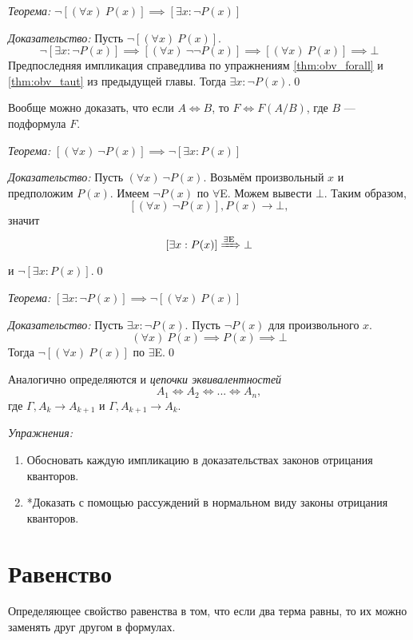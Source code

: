 \vspace{1em}
{\it Теорема:} $\lnot[(\forall x)~P(x)]\implies [\exists x:\lnot P(x)]$

{\it Доказательство:}
Пусть $\lnot[(\forall x)~P(x)]$.
\[
  \lnot[\exists x:\lnot P(x)]\implies [(\forall x)~\lnot\lnot P(x)]
  \implies [(\forall x)~P(x)]\implies\bot
\]
Предпоследняя импликация справедлива по упражнениям
\ref{thm:obv_forall} и \ref{thm:obv_taut} из предыдущей главы.
Тогда $\exists x:\lnot P(x)$.\qed

Вообще можно доказать, что если ${A\iff B}$, то ${F\iff F(A/B)}$,
где $B$ --- подформула $F$.

\vspace{1em}
{\it Теорема:} $[(\forall x)~\lnot P(x)]\implies \lnot[\exists x:P(x)]$

{\it Доказательство:}
Пусть $(\forall x)~\lnot P(x)$. Возьмём произвольный $x$
и предположим $P(x)$.
Имеем $\lnot P(x)$ по $\forall$E. Можем вывести $\bot$.
Таким образом,
\[
  [(\forall x)~\lnot P(x)],P(x)\to \bot,
\]
значит
\[
  [\exists x:P(x)]\xRightarrow{\exists\text{E}}\bot
\]
и $\lnot[\exists x:P(x)]$.\qed

\vspace{1em}
{\it Теорема:} $[\exists x:\lnot P(x)]\implies\lnot[(\forall x)~P(x)]$

{\it Доказательство:}
Пусть $\exists x:\lnot P(x)$. Пусть $\lnot P(x)$ для произвольного $x$.
\[
  (\forall x)~P(x)\implies P(x)\implies \bot
\]
Тогда $\lnot[(\forall x)~P(x)]$ по $\exists$E.\qed

\vspace{1em}
Аналогично определяются и {\it цепочки эквивалентностей}
\[
  A_1\iff A_2\iff ...\iff A_{n},
\]
где $\Gamma,A_{k}\to A_{k+1}$ и $\Gamma,A_{k+1}\to A_{k}$.

\vspace{1em}
{\it Упражнения:}
\begin{enumerate}
  \item{}Обосновать каждую импликацию в доказательствах законов отрицания кванторов.
  \item{}*Доказать с помощью рассуждений в нормальном виду законы отрицания кванторов.
\end{enumerate}

\section{Равенство}

Определяющее свойство равенства в том, что если два терма равны, то их можно
заменять друг другом в формулах.

